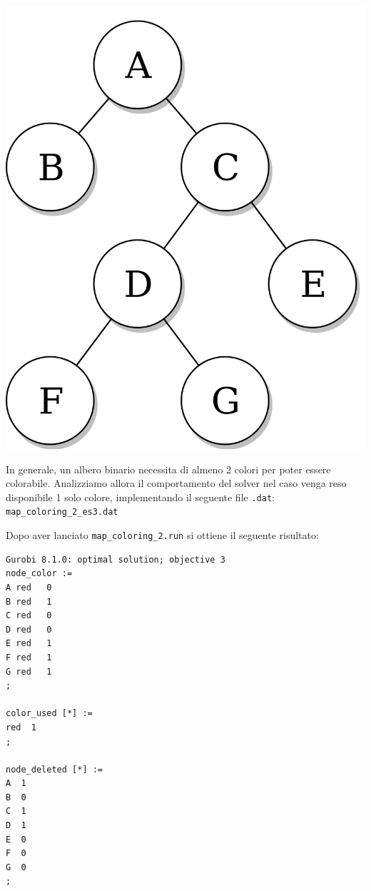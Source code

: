 \documentclass{article}
\begin{document}
\begin{center}
\includegraphics[scale=0.15]{tree.png}
\end{center}

\vspace{10mm}

In generale, un albero binario necessita di almeno 2 colori per poter essere colorabile. Analizziamo allora il comportamento del solver nel caso venga reso disponibile 1 solo colore, implementando il seguente file \texttt{.dat}:\\

\vspace{5mm}
\texttt{map\_coloring\_2\_es3.dat}

\vspace{5mm}

\pagebreak

Dopo aver lanciato \texttt{map\_coloring\_2.run} si ottiene il seguente risultato:\\

\begin{verbatim}
Gurobi 8.1.0: optimal solution; objective 3
node_color :=
A red   0
B red   1
C red   0
D red   0
E red   1
F red   1
G red   1
;

color_used [*] :=
red  1
;

node_deleted [*] :=
A  1
B  0
C  1
D  1
E  0
F  0
G  0
;
\end{verbatim}
\end{document}
